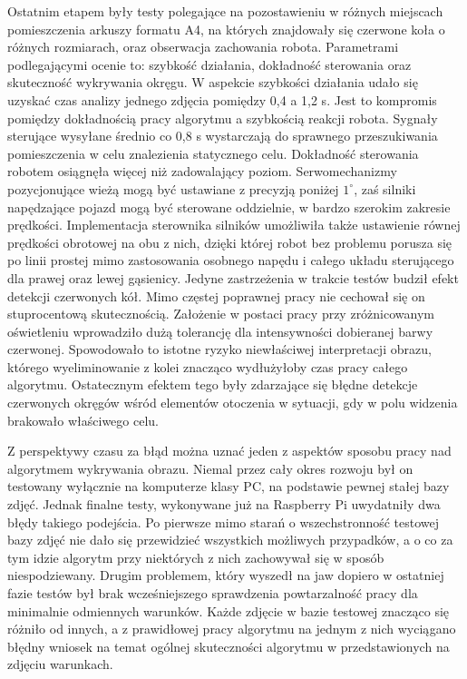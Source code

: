 Ostatnim etapem były testy polegające na pozostawieniu w różnych miejscach pomieszczenia arkuszy formatu A4, na których znajdowały się czerwone koła o różnych rozmiarach, oraz obserwacja zachowania robota. Parametrami podlegającymi ocenie to: szybkość działania, dokładność sterowania oraz skuteczność wykrywania okręgu. W aspekcie szybkości działania udało się uzyskać czas analizy jednego zdjęcia pomiędzy 0,4 a 1,2 s. Jest to kompromis pomiędzy dokładnością pracy algorytmu a szybkością reakcji robota. Sygnały sterujące wysyłane średnio co 0,8 s wystarczają do sprawnego przeszukiwania pomieszczenia w celu znalezienia statycznego celu. Dokładność sterowania robotem osiągnęła więcej niż zadowalający poziom. Serwomechanizmy pozycjonujące wieżą mogą być ustawiane z precyzją poniżej $1^\circ$, zaś silniki napędzające pojazd mogą być sterowane oddzielnie, w bardzo szerokim zakresie prędkości. Implementacja sterownika silników umożliwiła także ustawienie równej prędkości obrotowej na obu z nich, dzięki której robot bez problemu porusza się po linii prostej mimo zastosowania osobnego napędu i całego układu sterującego dla prawej oraz lewej gąsienicy. Jedyne zastrzeżenia w trakcie testów budził efekt detekcji czerwonych kół. Mimo częstej poprawnej pracy nie cechował się on stuprocentową skutecznością. Założenie w postaci pracy przy zróżnicowanym oświetleniu wprowadziło dużą tolerancję dla intensywności dobieranej barwy czerwonej. Spowodowało to istotne ryzyko niewłaściwej interpretacji obrazu, którego wyeliminowanie z kolei znacząco wydłużyłoby czas pracy całego algorytmu. Ostatecznym efektem tego były zdarzające się błędne detekcje czerwonych okręgów wśród elementów otoczenia w sytuacji, gdy w polu widzenia brakowało właściwego celu.

Z perspektywy czasu za błąd można uznać jeden z aspektów sposobu pracy nad algorytmem wykrywania obrazu. Niemal przez cały okres rozwoju był on testowany wyłącznie na komputerze klasy PC, na podstawie pewnej stałej bazy zdjęć. Jednak finalne testy, wykonywane już na Raspberry Pi uwydatniły dwa błędy takiego podejścia. Po pierwsze mimo starań o wszechstronność testowej bazy zdjęć nie dało się przewidzieć wszystkich możliwych przypadków, a o co za tym idzie algorytm przy niektórych z nich zachowywał się w sposób niespodziewany. Drugim problemem, który wyszedł na jaw dopiero w ostatniej fazie testów był brak wcześniejszego sprawdzenia powtarzalność pracy dla minimalnie odmiennych warunków. Każde zdjęcie w bazie testowej znacząco się różniło od innych, a z prawidłowej pracy algorytmu na jednym z nich wyciągano błędny wniosek na temat ogólnej skuteczności algorytmu w przedstawionych na zdjęciu warunkach.